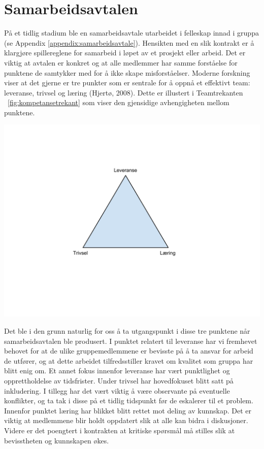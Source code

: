 \section{Samarbeidsavtalen}
På et tidlig stadium ble en samarbeidsavtale utarbeidet i felleskap innad i gruppa (se Appendix \ref{appendix:samarbeidsavtale}). Hensikten med en slik kontrakt er å klargjøre spillereglene for samarbeid i løpet av et prosjekt eller arbeid. Det er viktig at avtalen er konkret og at alle medlemmer har samme forståelse for punktene de samtykker med for å ikke skape misforståelser. Moderne forskning viser at det gjerne er tre punkter som er sentrale for å oppnå et effektivt team: leveranse, trivsel og læring (Hjertø, 2008). Dette er illustert i Teamtrekanten ~\ref{fig:kompetansetrekant} som viser den gjensidige avhengigheten mellom punktene.\\

\begin{center}
\includegraphics[clip=true, width=1 \textwidth,
trim=0cm 0cm 0cm 0cm]{kompetansetrekant.pdf}
\label{fig:kompetansetrekant}
\end{center}

Det ble i den grunn naturlig for oss å ta utgangspunkt i disse tre punktene når samarbeidsavtalen ble produsert. I punktet relatert til leveranse har vi fremhevet behovet for at de ulike gruppemedlemmene er bevisste på å ta ansvar for arbeid de utfører, og at dette arbeidet tilfredsstiller kravet om kvalitet som gruppa har blitt enig om. Et annet fokus innenfor leveranse har vært punktlighet og opprettholdelse av tidsfrister. Under trivsel har hovedfokuset blitt satt på inkludering. I tillegg har det vært viktig å være observante på eventuelle konflikter, og ta tak i disse på et tidlig tidspunkt før de eskalerer til et problem. Innenfor punktet læring har blikket blitt rettet mot deling av kunnskap. Det er viktig at medlemmene blir holdt oppdatert slik at alle kan bidra i diskusjoner. Videre er det poengtert i kontrakten at kritiske spørsmål må stilles slik at bevisstheten og kunnskapen økes.\\

